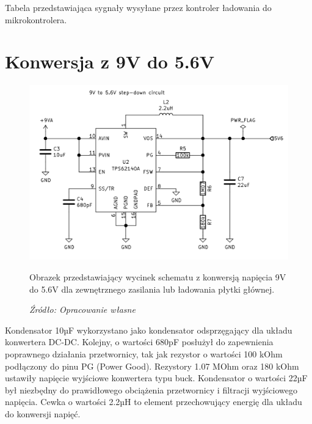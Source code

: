 \documentclass[12pt,a4paper,oneside]{memoir}
\begin{document}
\begin{table}[!h]
	\centering
	{\tytulyrozdzialow \footnotesize \caption[LT3652 - Sygnały statusu] {Tabela przedstawiająca sygnały wysyłane przez kontroler ładowania do mikrokontrolera.}}
	\caption*{\textit{Źródło: \cite{lt3652}}}
\end{table}
\section{Konwersja z 9V do 5.6V}
\begin{figure}[h]
	\centering
	\includegraphics[scale=0.25]{images/sch/sch-05.png}
	{\tytulyrozdzialow \footnotesize \caption[Schemat - konwersja do 5.6V] {Obrazek przedstawiający wycinek schematu z konwersją napięcia 9V do 5.6V dla zewnętrznego zasilania lub ładowania płytki głównej.}}
	\caption*{\textit{Źródło: Opracowanie własne}}
\end{figure}
\par Kondensator 10µF wykorzystano jako kondensator odsprzęgający dla układu konwertera DC-DC. Kolejny, o wartości 680pF posłużył do zapewnienia poprawnego działania przetwornicy, tak jak rezystor o wartości 100 kOhm podłączony do pinu PG (Power Good). Rezystory 1.07 MOhm oraz 180 kOhm ustawiły napięcie wyjściowe konwertera typu buck. Kondensator o wartości 22µF był niezbędny do prawidłowego obciążenia przetwornicy i filtracji wyjściowego napięcia. Cewka o wartości 2.2µH to element przechowujący energię dla układu do konwersji napięć.
\newpage
\end{document}

